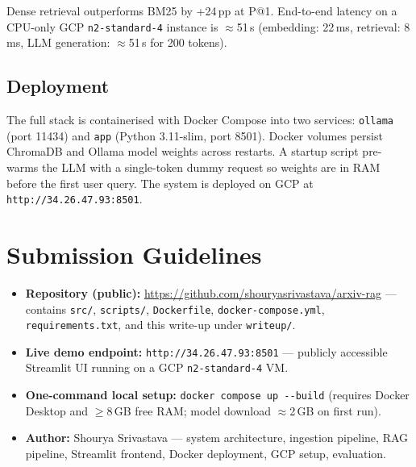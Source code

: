 \documentclass[paper=a4, fontsize=11pt]{scrartcl}
\begin{document}
Dense retrieval outperforms BM25 by +24\,pp at P@1.
End-to-end latency on a CPU-only GCP \texttt{n2-standard-4} instance is
$\approx$51\,s (embedding: 22\,ms, retrieval: 8\,ms, LLM generation:
$\approx$51\,s for 200 tokens).

\subsection{Deployment}
The full stack is containerised with Docker Compose into two services:
\texttt{ollama} (port 11434) and \texttt{app} (Python 3.11-slim, port 8501).
Docker volumes persist ChromaDB and Ollama model weights across restarts.
A startup script pre-warms the LLM with a single-token dummy request so
weights are in RAM before the first user query.
The system is deployed on GCP at \texttt{http://34.26.47.93:8501}.

\section{Submission Guidelines}

\begin{itemize}
  \item \textbf{Repository (public):}
        \url{https://github.com/shouryasrivastava/arxiv-rag} ---
        contains \texttt{src/}, \texttt{scripts/}, \texttt{Dockerfile},
        \texttt{docker-compose.yml}, \texttt{requirements.txt}, and this
        write-up under \texttt{writeup/}.
  \item \textbf{Live demo endpoint:}
        \texttt{http://34.26.47.93:8501} --- publicly accessible Streamlit UI
        running on a GCP \texttt{n2-standard-4} VM.
  \item \textbf{One-command local setup:}
        \texttt{docker compose up -{-}build} (requires Docker Desktop and
        $\geq$8\,GB free RAM; model download $\approx$2\,GB on first run).
  \item \textbf{Author:}
        Shourya Srivastava --- system architecture, ingestion pipeline, RAG
        pipeline, Streamlit frontend, Docker deployment, GCP setup, evaluation.
\end{itemize}



\end{document}
